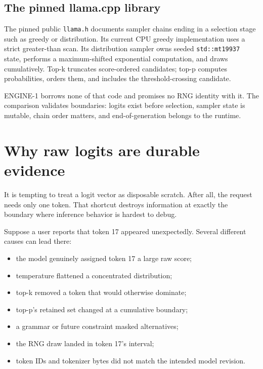 \subsection{The pinned llama.cpp
library}\label{the-pinned-llama.cpp-library}

The pinned public \texttt{llama.h} documents sampler chains ending in a
selection stage such as greedy or distribution. Its current CPU greedy
implementation uses a strict greater-than scan. Its distribution sampler
owns seeded \texttt{std::mt19937} state, performs a maximum-shifted
exponential computation, and draws cumulatively. Top-k truncates
score-ordered candidates; top-p computes probabilities, orders them, and
includes the threshold-crossing candidate.

ENGINE-1 borrows none of that code and promises no RNG identity with it.
The comparison validates boundaries: logits exist before selection,
sampler state is mutable, chain order matters, and end-of-generation
belongs to the runtime.

\section{Why raw logits are durable
evidence}\label{why-raw-logits-are-durable-evidence}

It is tempting to treat a logit vector as disposable scratch. After all,
the request needs only one token. That shortcut destroys information at
exactly the boundary where inference behavior is hardest to debug.

Suppose a user reports that token 17 appeared unexpectedly. Several
different causes can lead there:

\begin{itemize}
\tightlist
\item
  the model genuinely assigned token 17 a large raw score;
\item
  temperature flattened a concentrated distribution;
\item
  top-k removed a token that would otherwise dominate;
\item
  top-p's retained set changed at a cumulative boundary;
\item
  a grammar or future constraint masked alternatives;
\item
  the RNG draw landed in token 17's interval;
\item
  token IDs and tokenizer bytes did not match the intended model
  revision.
\end{itemize}

